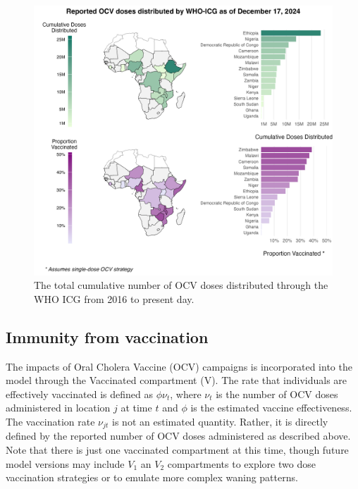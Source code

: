 \documentclass[
]{book}
\begin{document}
\begin{figure}

{\centering \includegraphics[width=1\linewidth]{figures/vaccination_maps} 

}

\caption{The total cumulative number of OCV doses distributed through the WHO ICG from 2016 to present day.}\label{fig:vaccination-maps}
\end{figure}

\subsection{Immunity from vaccination}\label{immunity-from-vaccination}

The impacts of Oral Cholera Vaccine (OCV) campaigns is incorporated into the model through the Vaccinated compartment (V). The rate that individuals are effectively vaccinated is defined as \(\phi\nu_t\), where \(\nu_t\) is the number of OCV doses administered in location \(j\) at time \(t\) and \(\phi\) is the estimated vaccine effectiveness. The vaccination rate \(\nu_{jt}\) is not an estimated quantity. Rather, it is directly defined by the reported number of OCV doses administered as described above. Note that there is just one vaccinated compartment at this time, though future model versions may include \(V_1\) an \(V_2\) compartments to explore two dose vaccination strategies or to emulate more complex waning patterns.
\end{document}
